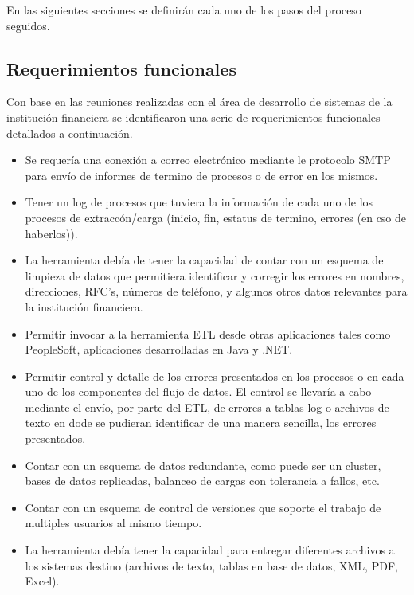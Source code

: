 En las siguientes secciones se definirán cada uno de los pasos del proceso
seguidos.

\subsection{Requerimientos funcionales}

Con base en las reuniones realizadas con el área de desarrollo de sistemas de la
institución financiera se identificaron una serie de requerimientos funcionales
detallados a continuación.

\begin{itemize}

\item Se requería una conexión a correo electrónico mediante le protocolo SMTP
  para envío de informes de termino de procesos o de error en los mismos.

\item Tener un log de procesos que tuviera la información de cada uno de los
  procesos de extraccón/carga (inicio, fin, estatus de termino, errores (en cso
  de haberlos)).

\item La herramienta debía de tener la capacidad de contar con un esquema de
  limpieza de datos que permitiera identificar y corregir los errores en
  nombres, direcciones, RFC's, números de teléfono, y algunos otros datos
  relevantes para la institución financiera.

\item Permitir invocar a la herramienta ETL desde otras aplicaciones tales como
  PeopleSoft, aplicaciones desarrolladas en Java y .NET.

\item Permitir control y detalle de los errores presentados en los procesos o en
  cada uno de los componentes del flujo de datos. El control se llevaría a cabo
  mediante el envío, por parte del ETL, de errores a tablas log o archivos de
  texto en dode se pudieran identificar de una manera sencilla, los errores
  presentados.

\item Contar con un esquema de datos redundante, como puede ser un cluster,
  bases de datos replicadas, balanceo de cargas con tolerancia a fallos, etc.

\item Contar con un esquema de control de versiones que soporte el trabajo de
  multiples usuarios al mismo tiempo.

\item La herramienta debía tener la capacidad para entregar diferentes archivos
  a los sistemas destino (archivos de texto, tablas en base de datos, XML, PDF,
  Excel).


\end{itemize}
